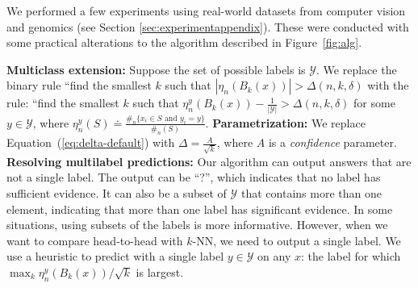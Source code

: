 \documentclass{article}
\newcommand{\algname}{\textsc{AKNN}}
\begin{document}
\newcommand{\labels}{\mathcal{Y}}

We performed a few experiments using real-world datasets from computer vision and genomics (see Section \ref{sec:experimentappendix}). 
These were conducted with some practical alterations to the algorithm described in Figure~\ref{fig:alg}. 

{\bf Multiclass extension:} Suppose the set of possible labels is  $\labels$. We
replace the binary rule ``find the smallest $k$ such that $\left|\eta_n(B_k(x))\right| >
\Delta(n, k,\delta)$ with the rule: ``find the smallest $k$ such that $\eta^y_n(B_k(x)) - \frac{1}{|\labels|}>
\Delta(n, k,\delta)$ for some $y \in \labels$,  where $\eta^y_n(S) \doteq \frac{\#_n\{x_i \in S
    \mbox{ and } y_i = y\}}{\#_n(S)}$.
    \newline
{\bf Parametrization:} 
We replace Equation~(\ref{eq:delta-default}) with $\Delta = \frac{A}{\sqrt{k}}$, where $A$ is a {\em confidence} parameter. \newline
{\bf Resolving multilabel predictions:} 
Our algorithm can output answers that are not a single label. 
The output can be ``?'', which indicates that no label has sufficient evidence. 
It can also be a subset of $\labels$ that contains more than one element, indicating that more than one label has significant evidence. 
In some situations, using subsets of the labels is more informative. 
However, when we want to compare head-to-head with $k$-NN, we need to output a single label. 
We use a heuristic to predict with a single label $y \in \labels$ on any $x$: the label for which $\max_k \eta^y_n(B_k(x))/\sqrt{k}$ is largest.

\pagebreak






\end{document}
